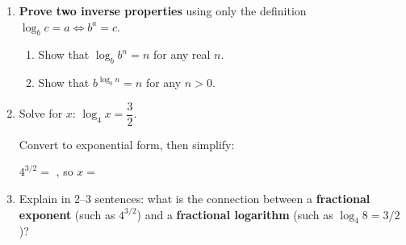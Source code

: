 \documentclass[10pt]{article}
\begin{document}
\vspace{0.08in}

\begin{tcolorbox}[colback=white, colframe=black!40,
    title=\textbf{Tier E --- Extend},
    fonttitle=\bfseries, arc=2mm, left=3mm, right=3mm, top=2mm, bottom=2mm]

\begin{enumerate}[itemsep=10pt]

  \item \textbf{Prove two inverse properties} using only the definition
        $\log_b c = a \Leftrightarrow b^a = c$.

        \begin{enumerate}[label=(\alph*), itemsep=8pt]
          \item Show that $\log_b b^n = n$ for any real $n$.


          \item Show that $b^{\log_b n} = n$ for any $n > 0$.

        \end{enumerate}

  \item Solve for $x$: $\log_4 x = \dfrac{3}{2}$.

        Convert to exponential form, then simplify:

        \vspace{0.06in}
        $4^{3/2} = $ \blank{3cm}, so $x = $ \blank{2.5cm}

  \item Explain in 2--3 sentences: what is the connection between a \textbf{fractional exponent}
        (such as $4^{3/2}$) and a \textbf{fractional logarithm} (such as $\log_4 8 = 3/2$)?


\end{enumerate}
\end{tcolorbox}
\end{document}
